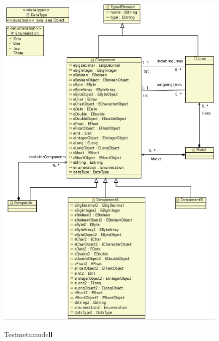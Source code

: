 \begin{figure}
	\centering	
	\includegraphics[scale=0.8]{img/testmetamodel.png}
	\label{img_testmetamodel}
	\caption{Testmetamodell}
\end{figure}


